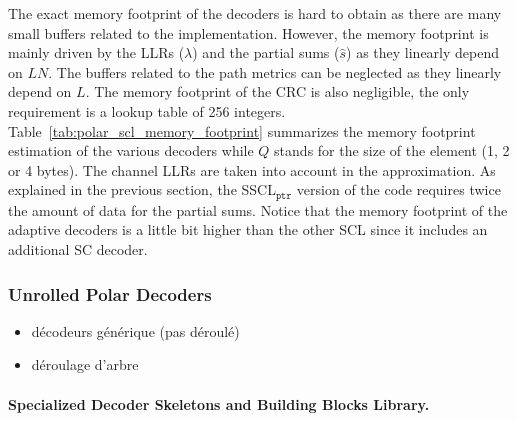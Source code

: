 The exact memory footprint of the decoders is hard to obtain as there are many
small buffers related to the implementation. However, the memory footprint is
mainly driven by the LLRs ($\lambda$) and the partial sums ($\hat{s}$) as they
linearly depend on $LN$. The buffers related to the path metrics can be
neglected as they linearly depend on $L$. The memory footprint of the CRC is
also negligible, the only requirement is a lookup table of 256 integers.
Table~\ref{tab:polar_scl_memory_footprint} summarizes the memory footprint
estimation of the various decoders while $Q$ stands for the size of the element
(1, 2 or 4 bytes). The channel LLRs are taken into account in the approximation.
As explained in the previous section, the SSCL$_{\texttt{ptr}}$ version of the
code requires twice the amount of data for the partial sums. Notice that the
memory footprint of the adaptive decoders is a little bit higher than the other
SCL since it includes an additional SC decoder.

\subsubsection{Unrolled Polar Decoders}

\begin{itemize}
  \item décodeurs générique (pas déroulé)
  \item déroulage d'arbre
\end{itemize}

\paragraph{Specialized Decoder Skeletons and Building Blocks Library.}

